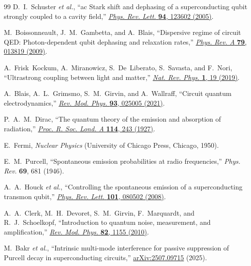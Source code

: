 \documentclass[reprint, floatfix, superscriptaddress, amsmath, amssymb, longbibliography]{revtex4-2}
\begin{document}
\begin{thebibliography}{99}
D.~I.~Schuster \textit{et al.}, ``ac Stark shift and dephasing of a superconducting qubit strongly coupled to a cavity field,'' 
\href{https://doi.org/10.1103/PhysRevLett.94.123602}{\textit{Phys. Rev. Lett.} \textbf{94}, 123602 (2005)}.

M.~Boissonneault, J.~M.~Gambetta, and A.~Blais, ``Dispersive regime of circuit QED: Photon-dependent qubit dephasing and relaxation rates,'' 
\href{https://doi.org/10.1103/PhysRevA.79.013819}{\textit{Phys. Rev. A} \textbf{79}, 013819 (2009)}.

A.~Frisk~Kockum, A.~Miranowicz, S.~De~Liberato, S.~Savasta, and F.~Nori, ``Ultrastrong coupling between light and matter,'' 
\href{https://doi.org/10.1038/s42254-018-0006-2}{\textit{Nat. Rev. Phys.} \textbf{1}, 19 (2019)}.

A.~Blais, A.~L.~Grimsmo, S.~M.~Girvin, and A.~Wallraff, ``Circuit quantum electrodynamics,'' 
\href{https://doi.org/10.1103/RevModPhys.93.025005}{\textit{Rev. Mod. Phys.} \textbf{93}, 025005 (2021)}.

P.~A.~M.~Dirac, ``The quantum theory of the emission and absorption of radiation,'' 
\href{https://doi.org/10.1098/rspa.1927.0039}{\textit{Proc. R. Soc. Lond. A} \textbf{114}, 243 (1927)}.

E.~Fermi, \textit{Nuclear Physics} (University of Chicago Press, Chicago, 1950).

E.~M.~Purcell, ``Spontaneous emission probabilities at radio frequencies,'' 
\textit{Phys. Rev.} \textbf{69}, 681 (1946).

A.~A.~Houck \textit{et al.}, ``Controlling the spontaneous emission of a superconducting transmon qubit,'' 
\href{https://doi.org/10.1103/PhysRevLett.101.080502}{\textit{Phys. Rev. Lett.} \textbf{101}, 080502 (2008)}.

A.~A.~Clerk, M.~H.~Devoret, S.~M.~Girvin, F.~Marquardt, and R.~J.~Schoelkopf, ``Introduction to quantum noise, measurement, and amplification,'' 
\href{https://doi.org/10.1103/RevModPhys.82.1155}{\textit{Rev. Mod. Phys.} \textbf{82}, 1155 (2010)}.

M.~Bakr \textit{et al.}, ``Intrinsic multi-mode interference for passive suppression of Purcell decay in superconducting circuits,'' 
\href{https://arxiv.org/abs/2507.09715}{arXiv:2507.09715} (2025).


\end{thebibliography}
\end{document}
